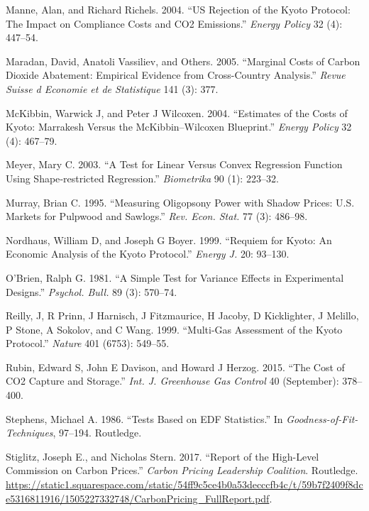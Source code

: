 \documentclass[
  10pt,
]{article}
\begin{document}
\leavevmode\hypertarget{ref-Manne2004}{}%
Manne, Alan, and Richard Richels. 2004. ``US Rejection of the Kyoto
Protocol: The Impact on Compliance Costs and CO2 Emissions.''
\emph{Energy Policy} 32 (4): 447--54.

\leavevmode\hypertarget{ref-Maradan2005}{}%
Maradan, David, Anatoli Vassiliev, and Others. 2005. ``Marginal Costs of
Carbon Dioxide Abatement: Empirical Evidence from Cross-Country
Analysis.'' \emph{Revue Suisse d Economie et de Statistique} 141 (3):
377.

\leavevmode\hypertarget{ref-McKibbin2004}{}%
McKibbin, Warwick J, and Peter J Wilcoxen. 2004. ``Estimates of the
Costs of Kyoto: Marrakesh Versus the McKibbin--Wilcoxen Blueprint.''
\emph{Energy Policy} 32 (4): 467--79.

\leavevmode\hypertarget{ref-Meyer2003}{}%
Meyer, Mary C. 2003. ``A Test for Linear Versus Convex Regression
Function Using Shape‐restricted Regression.'' \emph{Biometrika} 90 (1):
223--32.

\leavevmode\hypertarget{ref-Murray1995}{}%
Murray, Brian C. 1995. ``Measuring Oligopsony Power with Shadow Prices:
U.S. Markets for Pulpwood and Sawlogs.'' \emph{Rev. Econ. Stat.} 77 (3):
486--98.

\leavevmode\hypertarget{ref-Nordhaus1999}{}%
Nordhaus, William D, and Joseph G Boyer. 1999. ``Requiem for Kyoto: An
Economic Analysis of the Kyoto Protocol.'' \emph{Energy J.} 20: 93--130.

\leavevmode\hypertarget{ref-OBrien1981}{}%
O'Brien, Ralph G. 1981. ``A Simple Test for Variance Effects in
Experimental Designs.'' \emph{Psychol. Bull.} 89 (3): 570--74.

\leavevmode\hypertarget{ref-Reilly1999}{}%
Reilly, J, R Prinn, J Harnisch, J Fitzmaurice, H Jacoby, D Kicklighter,
J Melillo, P Stone, A Sokolov, and C Wang. 1999. ``Multi-Gas Assessment
of the Kyoto Protocol.'' \emph{Nature} 401 (6753): 549--55.

\leavevmode\hypertarget{ref-Rubin2015}{}%
Rubin, Edward S, John E Davison, and Howard J Herzog. 2015. ``The Cost
of CO2 Capture and Storage.'' \emph{Int. J. Greenhouse Gas Control} 40
(September): 378--400.

\leavevmode\hypertarget{ref-Stephens1986}{}%
Stephens, Michael A. 1986. ``Tests Based on EDF Statistics.'' In
\emph{Goodness-of-Fit-Techniques}, 97--194. Routledge.

\leavevmode\hypertarget{ref-CPLC2017}{}%
Stiglitz, Joseph E., and Nicholas Stern. 2017. ``Report of the
High-Level Commission on Carbon Prices.'' \emph{Carbon Pricing
Leadership Coalition}. Routledge.
\url{https://static1.squarespace.com/static/54ff9c5ce4b0a53decccfb4c/t/59b7f2409f8dce5316811916/1505227332748/CarbonPricing_FullReport.pdf}.
\end{document}
